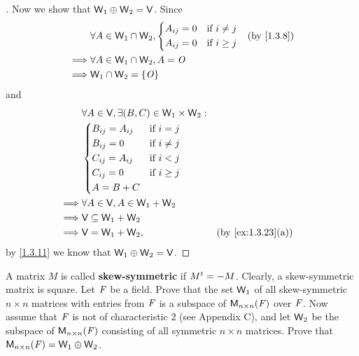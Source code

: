 \begin{proof}[]
	Now we show that \(\mathsf{W}_1 \oplus \mathsf{W}_2 = \mathsf{V}\).
	Since
	\begin{align*}
		         & \forall A \in \W_1 \cap \W_2, \begin{dcases}
			                                         A_{i j} = 0 & \text{if } i \neq j \\
			                                         A_{i j} = 0 & \text{if } i \geq j
		                                         \end{dcases} &  & \by{1.3.8} \\
		\implies & \forall A \in \W_1 \cap \W_2, A = \zm                           \\
		\implies & \W_1 \cap \W_2 = \set{\zm}
	\end{align*}
	and
	\begin{align*}
		         & \forall A \in \V, \exists (B, C) \in \W_1 \times \W_2 :                        \\
		         & \begin{dcases}
			           B_{i j} = A_{i j} & \text{if } i = j    \\
			           B_{i j} = 0       & \text{if } i \neq j \\
			           C_{i j} = A_{i j} & \text{if } i < j    \\
			           C_{i j} = 0       & \text{if } i \geq j \\
			           A = B + C
		           \end{dcases}                                        \\
		\implies & \forall A \in \V, A \in \W_1 + \W_2                                            \\
		\implies & \V \subseteq \W_1 + \W_2                                                       \\
		\implies & \V = \W_1 + \W_2,                                       &  & \by{ex:1.3.23}[a]
	\end{align*}
	by \cref{1.3.11} we know that \(\mathsf{W}_1 \oplus \mathsf{W}_2 = \mathsf{V}\).
\end{proof}

\begin{ex}\label{ex:1.3.28}
	A matrix \(M\) is called \textbf{skew-symmetric} if \({M}^{t} = -M\).
	Clearly, a skew-symmetric matrix is square.
	Let \(\mathit{F}\) be a field.
	Prove that the set \(\mathsf{W}_1\) of all skew-symmetric \(n \times n\) matrices with entries from \(\mathit{F}\) is a subspace of \(\mathsf{M}_{{n} \times n}({\mathit{F}})\) over \(\mathit{F}\).
	Now assume that \(\mathit{F}\) is not of characteristic \(2\) (see Appendix C), and let \(\mathsf{W}_2\) be the subspace of \(\mathsf{M}_{{n} \times n}({\mathit{F}})\) consisting of all symmetric \(n \times n\) matrices.
	Prove that \(\mathsf{M}_{{n} \times n}({\mathit{F}}) = \mathsf{W}_1 \oplus \mathsf{W}_2\).
\end{ex}

